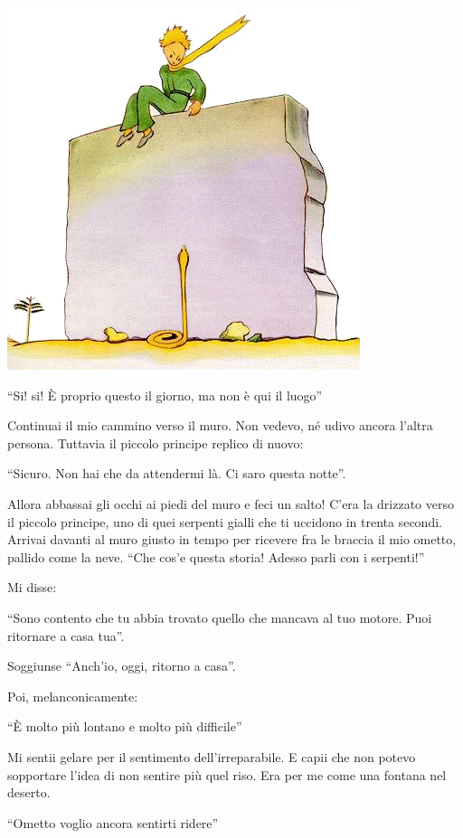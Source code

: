 \documentclass[11pt]{scrbook}
\begin{document}
\begin{center}
\includegraphics{img/26a}
\end{center}

``Si! si! È proprio questo il giorno, ma non è qui il luogo''

Continuai il mio cammino verso il muro. Non vedevo, né udivo ancora
l'altra persona. Tuttavia il piccolo principe replico di nuovo:

``Sicuro. Non hai che da attendermi là. Ci saro questa notte''.

Allora abbassai gli occhi ai piedi del muro e feci un salto! C'era la
drizzato verso il piccolo principe, uno di quei serpenti gialli che ti
uccidono in trenta secondi. Arrivai davanti al muro giusto in tempo per
ricevere fra le braccia il mio ometto, pallido come la neve. ``Che cos'e
questa storia! Adesso parli con i serpenti!''

Mi disse:

``Sono contento che tu abbia trovato quello che mancava al tuo motore.
Puoi ritornare a casa tua''.

Soggiunse ``Anch'io, oggi, ritorno a casa''.

Poi, melanconicamente:

``È molto più lontano e molto più difficile''

Mi sentii gelare per il sentimento dell'irreparabile. E capii che non
potevo sopportare l'idea di non sentire più quel riso. Era per me come
una fontana nel deserto.

``Ometto voglio ancora sentirti ridere''
\end{document}
